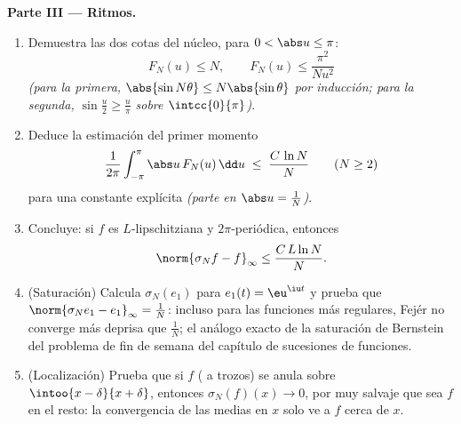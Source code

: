 \begin{problem}
\medskip
\noindent\textbf{Parte III --- Ritmos.}
\begin{enumerate}[resume]
  \item Demuestra las dos cotas del núcleo, para $0 < \abs u \leq
        \pi$:
        \[
        F_N(u) \leq N,
        \qquad
        F_N(u) \leq \frac{\pi^2}{N u^2}
        \]
        \emph{(para la primera, $\abs{\sin N\theta} \leq
        N\abs{\sin\theta}$ por inducción; para la segunda,
        $\sin\frac u2 \geq \frac{u}{\pi}$ sobre
        $\intcc{0}{\pi}$)}.
  \item Deduce la estimación del primer momento
        \[
        \frac{1}{2\pi}\int_{-\pi}^{\pi}\abs u\,F_N(u)\,\dd u
        \;\leq\; \frac{C\,\ln N}{N}
        \qquad (N \geq 2)
        \]
        para una constante explícita \emph{(parte en $\abs u =
        \frac1N$)}.
  \item Concluye: si $f$ es $L$-lipschitziana y $2\pi$-periódica,
        entonces
        \[
        \norm{\sigma_N f - f}_\infty \leq \frac{C\,L\ln N}{N} .
        \]
  \item (Saturación) Calcula $\sigma_N(e_1)$ para $e_1(t) = \eu^{\iu
        t}$ y prueba que $\norm{\sigma_Ne_1 - e_1}_\infty =
        \frac1N$: incluso para las funciones más regulares, Fejér
        no converge más deprisa que $\frac1N$; el análogo exacto de
        la saturación de Bernstein del problema de fin de semana del
        capítulo de sucesiones de funciones.
  \item (Localización) Prueba que si $f$ ( a trozos) se anula
        sobre $\intoo{x - \delta}{x + \delta}$, entonces
        $\sigma_N(f)(x) \to 0$, por muy salvaje que sea $f$ en el
        resto: la convergencia de las medias en $x$ solo ve a $f$
        cerca de $x$.
\end{enumerate}


\end{problem}
